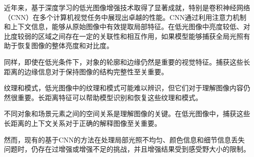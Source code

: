 \documentclass[a4paper, 10pt]{article}
\begin{document}
		
		近年来，基于深度学习的低光图像增强技术取得了显著成就，特别是卷积神经网络（CNN）在多个计算机视觉任务中展现出卓越的性能。CNN通过利用注意力机制\cite{yang2021locally,zhang2020attention}和上下文信息，能够从原始图像中有效提取局部特征\cite{jain1991unsupervised, lowe2004distinctive, ojala2002multiresolution}。在低光图像中亮度较低、对比度较弱的区域之间存在一定的关联性和相互作用，如果模型能够捕获全局光照有助于恢复图像的整体亮度和对比度。
		
		同样，即使在低光条件下，对象的轮廓和边缘仍然是重要的视觉特征。捕获这些长距离的边缘信息对于保持图像的结构完整性至关重要。
		
		纹理和模式，低光图像中的纹理和模式可能难以辨识，但它们对于理解图像内容仍然很重要。长距离特征可以帮助模型识别和恢复这些纹理和模式。
		
		不同对象和场景元素之间的空间关系是理解图像的关键。在低光图像中，捕获这些长距离的上下文关系对于正确的解释图像至关重要。
		
		然而，现有的基于CNN的方法在处理局部光照不均匀、颜色信息和细节信息丢失问题时，仍存在过增强或增强不足的挑战，并且增强结果受到感受野大小的限制。
		
		
\end{document}
